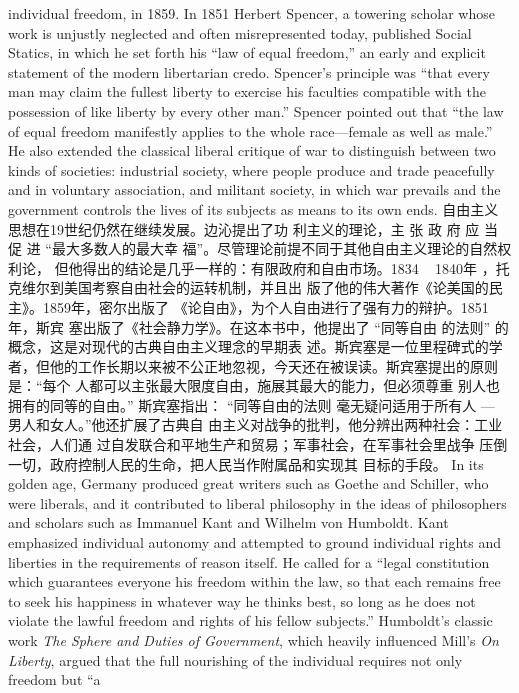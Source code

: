 \begin{paracol}{2}
individual freedom, in 1859. In 1851 Herbert Spencer, a towering scholar whose work is unjustly neglected and often misrepresented today, published Social Statics, in which he set forth his
``law of equal freedom,'' an early and explicit statement of the
modern libertarian credo. Spencer's principle was ``that every
man may claim the fullest liberty to exercise his faculties compatible with the possession of like liberty by every other man.''
Spencer pointed out that ``the law of equal freedom manifestly
applies to the whole race---female as well as male.'' He also extended the classical liberal critique of war to distinguish between two kinds of societies: industrial society, where people
produce and trade peacefully and in voluntary association, and
militant society, in which war prevails and the government controls the lives of its subjects as means to its own ends.
\switchcolumn
自由主义思想在19世纪仍然在继续发展。边沁提出了功
利主义的理论，主 张 政 府 应 当 促 进 “最大多数人的最大幸
福”。尽管理论前提不同于其他自由主义理论的自然权利论，
但他得出的结论是几乎一样的：有限政府和自由市场。1834 ~
1840年 ，托克维尔到美国考察自由社会的运转机制，并且出
版了他的伟大著作《论美国的民主》。1859年，密尔出版了
《论自由》，为个人自由进行了强有力的辩护。1851年，斯宾
塞出版了《社会静力学》。在这本书中，他提出了 “同等自由
的法则” 的概念，这是对现代的古典自由主义理念的早期表
述。斯宾塞是一位里程碑式的学者，但他的工作长期以来被不公正地忽视，今天还在被误读。斯宾塞提出的原则是：“每个
人都可以主张最大限度自由，施展其最大的能力，但必须尊重
别人也拥有的同等的自由。” 斯宾塞指出： “同等自由的法则
毫无疑问适用于所有人 --- 男人和女人。”他还扩展了古典自
由主义对战争的批判，他分辨出两种社会：工业社会，人们通
过自发联合和平地生产和贸易；军事社会，在军事社会里战争
压倒一切，政府控制人民的生命，把人民当作附属品和实现其
目标的手段。
\switchcolumn*
In its golden age, Germany produced great writers such as
Goethe and Schiller, who were liberals, and it contributed to
liberal philosophy in the ideas of philosophers and scholars such
as Immanuel Kant and Wilhelm von Humboldt. Kant emphasized individual autonomy and attempted to ground individual
rights and liberties in the requirements of reason itself. He
called for a ``legal constitution which guarantees everyone his
freedom within the law, so that each remains free to seek his
happiness in whatever way he thinks best, so long as he does
not violate the lawful freedom and rights of his fellow subjects.''
Humboldt's classic work \textit{The Sphere and Duties of Government}, which heavily influenced Mill's \textit{On Liberty}, argued that the full nourishing of the individual requires not only freedom but ``a

\end{paracol}
